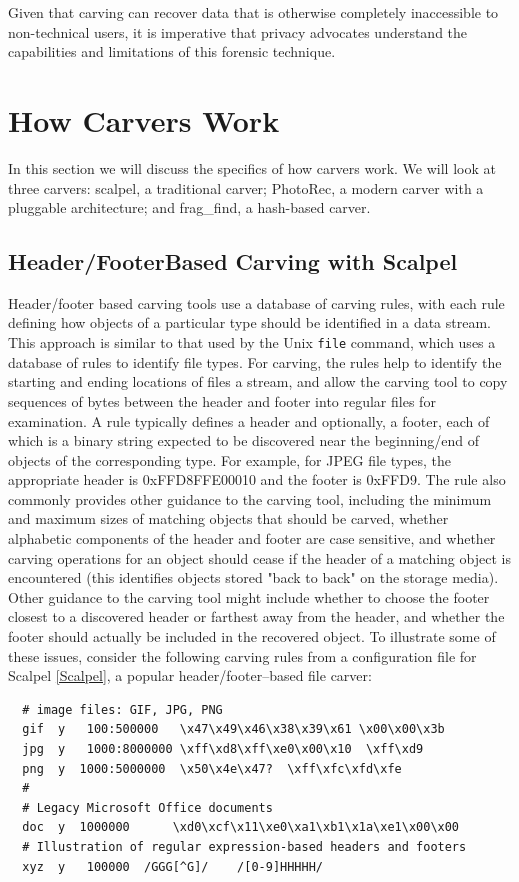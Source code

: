 Given that carving can recover data that is otherwise completely inaccessible to non-technical users, it is imperative that privacy advocates understand the capabilities and limitations of this forensic technique.  


\section{How Carvers Work}
In this section we will discuss the specifics of how carvers work. We
will look at three carvers: scalpel, a traditional carver; PhotoRec, a
modern carver with a pluggable architecture; and frag\_find, a
hash-based carver.

\subsection{Header/Footer\-Based Carving with Scalpel}

Header/footer based carving tools use a database of carving rules,
with each rule defining how objects of a particular type should be
identified in a data stream. This approach is similar to that used by
the Unix {\tt file} command, which uses a database of rules to
identify file types.  For carving, the rules help to identify the
starting and ending locations of files a stream, and allow the carving
tool to copy sequences of bytes between the header and footer into
regular files for examination.  A rule typically defines a header and
optionally, a footer, each of which is a binary string expected to be
discovered near the beginning/end of objects of the corresponding
type.  For example, for JPEG file types, the appropriate header is
0xFFD8FFE00010 and the footer is 0xFFD9.  The rule also commonly
provides other guidance to the carving tool, including the minimum and
maximum sizes of matching objects that should be carved, whether
alphabetic components of the header and footer are case sensitive, and
whether carving operations for an object should cease if the header of
a matching object is encountered (this identifies objects stored "back
to back" on the storage media).  Other guidance to the carving tool
might include whether to choose the footer closest to a discovered
header or farthest away from the header, and whether the footer should
actually be included in the recovered object.  To illustrate some of
these issues, consider the following carving rules from a
configuration file for Scalpel \ref{Scalpel}, a popular
header/footer--based file carver:

{
\begin{Verbatim}
  # image files: GIF, JPG, PNG
  gif  y   100:500000   \x47\x49\x46\x38\x39\x61 \x00\x00\x3b
  jpg  y   1000:8000000 \xff\xd8\xff\xe0\x00\x10  \xff\xd9
  png  y  1000:5000000  \x50\x4e\x47?  \xff\xfc\xfd\xfe
  #
  # Legacy Microsoft Office documents
  doc  y  1000000      \xd0\xcf\x11\xe0\xa1\xb1\x1a\xe1\x00\x00 
  # Illustration of regular expression-based headers and footers
  xyz  y   100000  /GGG[^G]/    /[0-9]HHHHH/
\end{Verbatim}
}

